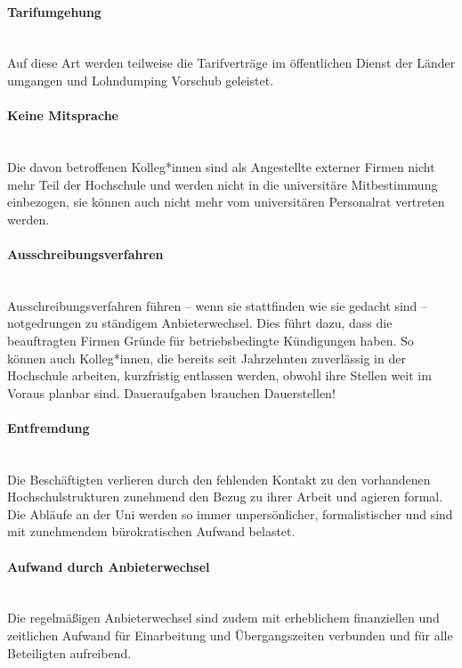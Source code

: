 \documentclass[DIV=calc]{scrartcl}
\begin{document}
\vspace{-5mm}\paragraph{Tarifumgehung} \mbox{}\\
Auf diese Art werden teilweise die Tarifverträge im öffentlichen Dienst der Länder umgangen und Lohndumping Vorschub geleistet.

\vspace{-5mm}\paragraph{Keine Mitsprache} \mbox{}\\
Die davon betroffenen Kolleg*innen sind als Angestellte externer Firmen nicht mehr Teil der Hochschule und werden nicht in die universitäre Mitbestimmung einbezogen, sie können auch nicht mehr vom universitären Personalrat vertreten werden.

\vspace{-5mm}\paragraph{Ausschreibungsverfahren} \mbox{}\\
Ausschreibungsverfahren führen – wenn sie stattfinden wie sie gedacht sind – notgedrungen zu ständigem Anbieterwechsel. Dies führt dazu, dass die beauftragten Firmen Gründe für betriebsbedingte Kündigungen haben. So können auch Kolleg*innen, die bereits seit Jahrzehnten zuverlässig in der Hochschule arbeiten, kurzfristig entlassen werden, obwohl ihre Stellen weit im Voraus planbar sind. Daueraufgaben brauchen Dauerstellen!

\vspace{-5mm}\paragraph{Entfremdung} \mbox{}\\
Die Beschäftigten verlieren durch den fehlenden Kontakt zu den vorhandenen Hochschulstrukturen zunehmend den Bezug zu ihrer Arbeit und agieren formal. Die Abläufe an der Uni werden so immer unpersönlicher, formalistischer und sind mit zunehmendem bürokratischen Aufwand belastet.

\vspace{-5mm}\paragraph{Aufwand durch Anbieterwechsel} \mbox{}\\
Die regelmäßigen Anbieterwechsel sind zudem mit erheblichem finanziellen und zeitlichen Aufwand für Einarbeitung und Übergangszeiten verbunden und für alle Beteiligten aufreibend.
\end{document}
